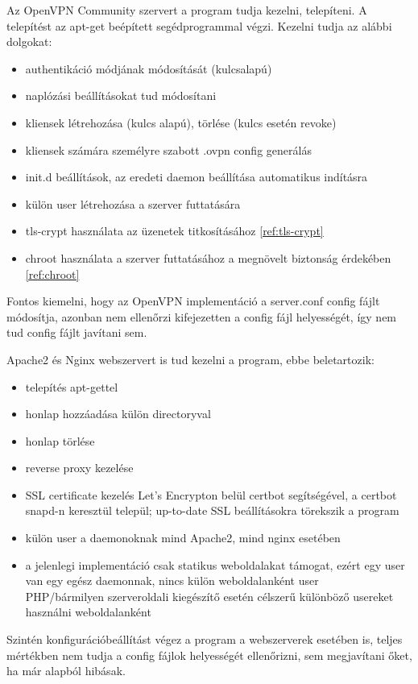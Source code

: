 Az OpenVPN Community szervert a program tudja kezelni, telepíteni. A telepítést az apt-get beépített segédprogrammal végzi. Kezelni tudja az alábbi dolgokat:
\begin{itemize}
	\item authentikáció módjának módosítását (kulcsalapú)
	\item naplózási beállításokat tud módosítani
	\item kliensek létrehozása (kulcs alapú), törlése (kulcs esetén revoke)
	\item kliensek számára személyre szabott .ovpn config generálás
	\item init.d beállítások, az eredeti daemon beállítása automatikus indításra
	\item külön user létrehozása a szerver futtatására
	\item tls-crypt használata az üzenetek titkosításához \ref{ref:tls-crypt}
	\item chroot használata a szerver futtatásához a megnövelt biztonság érdekében \ref{ref:chroot}
\end{itemize}
Fontos kiemelni, hogy az OpenVPN implementáció a server.conf config fájlt módosítja, azonban nem ellenőrzi kifejezetten a config fájl helyességét, így nem tud config fájlt javítani sem.

Apache2 és Nginx webszervert is tud kezelni a program, ebbe beletartozik:
\begin{itemize}
	\item telepítés apt-gettel
	\item honlap hozzáadása külön directoryval
	\item honlap törlése
	\item reverse proxy kezelése
	\item SSL certificate kezelés Let's Encrypton belül certbot segítségével, a certbot snapd-n keresztül települ; up-to-date SSL beállításokra törekszik a program
	\item külön user a daemonoknak mind Apache2, mind nginx esetében
	\item a jelenlegi implementáció csak statikus weboldalakat támogat, ezért egy user van egy egész daemonnak, nincs külön weboldalanként user\\PHP/bármilyen szerveroldali kiegészítő esetén célszerű különböző usereket használni weboldalanként
\end{itemize}

Szintén konfigurációbeállítást végez a program a webszerverek esetében is, teljes mértékben nem tudja a config fájlok helyességét ellenőrizni, sem megjavítani őket, ha már alapból hibásak.

